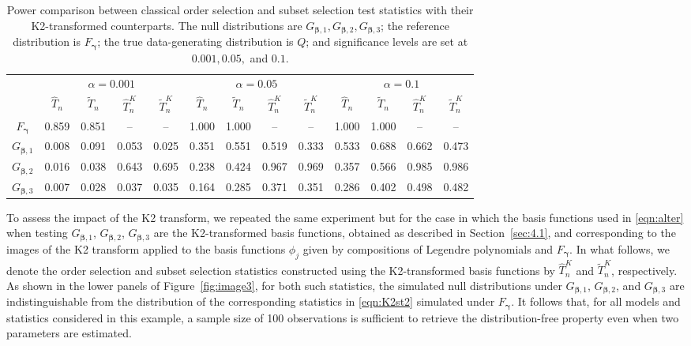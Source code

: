 \documentclass[11pt]{article}
\newcommand{\vect}[1]{\boldsymbol{#1}}
\begin{document}
\begin{table}[t]
\begin{center}
\small	
\setlength{\tabcolsep}{4pt}
\begin{tabular}{|c|cccc|cccc|cccc|}
\hline
\multirow{2}{*}{}
 & \multicolumn{4}{c|}{$\alpha=0.001$}
 & \multicolumn{4}{c|}{$\alpha=0.05$}
 & \multicolumn{4}{c|}{$\alpha=0.1$} \\ 
\cline{2-13}
 & \rule{0pt}{1.4em} $\widehat{T}_n$ & $\widetilde{T}_n$ & $\widehat{T}^{K}_n$ & $\widetilde{T}^{K}_n$
 & $\widehat{T}_n$ & $\widetilde{T}_n$ & $\widehat{T}^{K}_n$ & $\widetilde{T}^{K}_n$
 & $\widehat{T}_n$ & $\widetilde{T}_n$ & $\widehat{T}^{K}_n$ & $\widetilde{T}^{K}_n$ \\
\hline
$F_{\vect{\gamma}}$
 & 0.859 & 0.851 &  --  &  --
 & 1.000 & 1.000 &  --  &  --
 & 1.000 & 1.000 &  --  &  --  \\
\hline
$G_{\vect{\beta},1}$
 & 0.008 & 0.091 & 0.053 & 0.025
 & 0.351 & 0.551 & 0.519 & 0.333
 & 0.533 & 0.688 & 0.662 & 0.473 \\
\hline
$G_{\vect{\beta},2}$
 & 0.016 & 0.038 & 0.643 & 0.695
 & 0.238 & 0.424 & 0.967 & 0.969
 & 0.357 & 0.566 & 0.985 & 0.986 \\
\hline
$G_{\vect{\beta},3}$
 & 0.007 & 0.028 & 0.037 & 0.035
 & 0.164 & 0.285 & 0.371 & 0.351
 & 0.286 & 0.402 & 0.498 & 0.482 \\
\hline
\end{tabular}
\end{center}
\caption{Power comparison between classical order selection and subset selection test 
statistics with their K2-transformed counterparts. The null distributions are $G_{\vect{\beta},1}, G_{\vect{\beta},2}, G_{\vect{\beta},3}$; the reference distribution is $F_{\vect{\gamma}}$; the true data-generating distribution is $Q$; and significance levels are set at $0.001, 0.05,$ and $0.1$.}
\label{tab:1}
\end{table}

To assess the impact of the K2 transform, we repeated the same experiment but for the case in which the basis functions used in \eqref{eqn:alter} when testing $G_{\vect{\beta},1}$, $G_{\vect{\beta},2}$, $G_{\vect{\beta},3}$ are the K2-transformed basis functions, obtained as described in Section~\ref{sec:4.1}, and corresponding to the images of the K2 transform applied to the basis functions $\phi_j$ given by compositions of Legendre polynomials and $F_{\vect{\gamma}}$. In what follows, we denote the order selection and subset selection statistics constructed using the K2-transformed basis functions by $\widehat{T}^{K}_n$ and $\widetilde{T}^{K}_n$, respectively. As shown in the lower panels of Figure~\ref{fig:image3}, for both such statistics, the simulated null distributions under $G_{\vect{\beta},1}$, $G_{\vect{\beta},2}$, and $G_{\vect{\beta},3}$ are  indistinguishable from the distribution of the corresponding statistics in \eqref{eqn:K2st2} simulated under $F_{\vect{\gamma}}$. It follows that, for all models and statistics considered in this example, a sample size of 100 observations is sufficient to retrieve the distribution-free property even when two parameters are estimated. 
\end{document}
